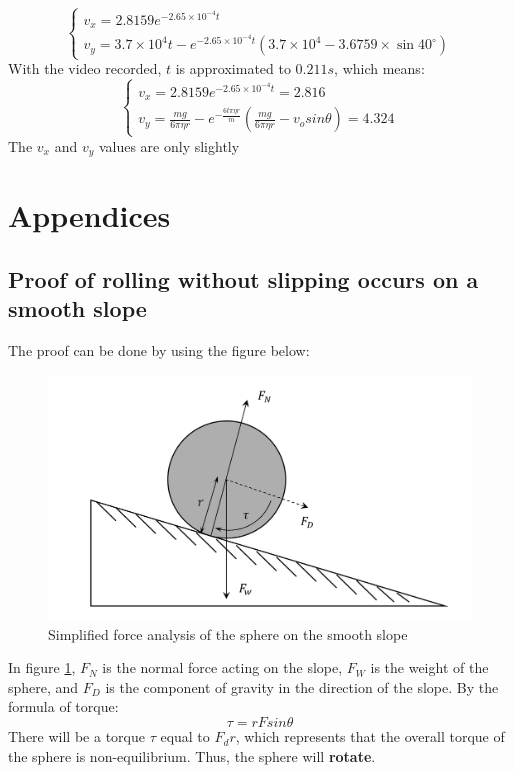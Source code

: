 \documentclass{article}
\begin{document}
\begin{equation}
    \begin{cases}
       v_x = 2.8159e^{-2.65\times10^{-4}t} \\
       v_y = 3.7\times10^4t - e^{-2.65\times10^{-4}t}(3.7\times10^4-3.6759\times\sin{40^\circ}) \nonumber 
    \end{cases}
\end{equation}
With the video recorded, $t$ is approximated to $0.211s$, which means:
\begin{equation}
   \begin{cases}
       v_x = 2.8159e^{-2.65\times10^{-4}t} = 2.816 \\
       v_y = \frac{mg}{6\pi\eta r} - e^{-\frac{6t\pi\eta r}{m}}(\frac{mg}{6\pi\eta r}-v_osin\theta) = 4.324 
   \end{cases} 
\end{equation}
The $v_x$ and $v_y$ values are only slightly 
\newpage
\appendix
\section{Appendices}
    \subsection{Proof of rolling without slipping occurs on a smooth slope} \label{proofofslide}
        The proof can be done by using the figure below:
        \begin{figure}[H]
            \centering
            \includegraphics[width=0.5\linewidth]{no_friction.png}
            \caption{Simplified force analysis of the sphere on the smooth slope}
            \label{frictionless}
        \end{figure}
        In figure \ref{frictionless}, $F_N$ is the normal force acting on the slope, $F_W$ is the weight of the sphere, and $F_D$ is the component of gravity in the direction of the slope.
        By the formula of torque:
        \begin{equation}
            \tau = rFsin\theta
        \end{equation}
        There will be a torque $\tau$ equal to $F_dr$, which represents that the overall torque of the sphere is non-equilibrium. Thus, the sphere will \textbf{rotate}.
\end{document}
